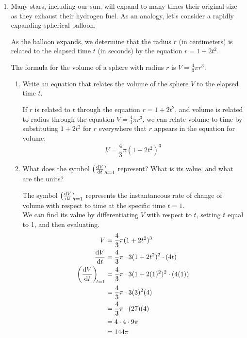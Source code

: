 \documentclass[main]{subfiles}
\begin{document}
\begin{enumerate}
\item Many stars, including our sun, will expand to many times their original size as they exhaust their hydrogen fuel. As an analogy, let's consider a rapidly expanding spherical balloon.

As the balloon expands, we determine that the radius $r$ (in centimeters) is related to the elapsed time $t$ (in seconds) by the equation $r=1+2t^2$.

The formula for the volume of a sphere with radius $r$ is $V=\tfrac{4}{3}\pi r^3$.

\begin{enumerate}
\item
\begin{problem}
Write an equation that relates the volume of the sphere $V$ to the elapsed time $t$.
\end{problem}

\begin{solution}
    If $r$ is related to $t$ through the equation $r=1+2t^2$, and volume is related to radius through the equation $V=\frac{4}{3}\pi r^3$, we can relate volume to time by substituting $1+2t^2$ for $r$ everywhere that $r$ appears in the equation for volume.
    $$V=\frac{4}{3} \pi (1+2t^2)^3$$
\end{solution}
\item
\begin{problem}
What does the symbol $\diff{V}{t}[t=1]$ represent? What is its value, and what are the units?
\end{problem}
\pspace{\vfill}

\begin{solution}
    The symbol $\diff{V}{t}[t=1]$ represents the instantaneous rate of change of volume with respect to time at the specific time $t=1$.\\
    We can find its value by differentiating $V$ with respect to $t$, setting $t$ equal to 1, and then evaluating.\\
    \begin{align*}
        V &=\frac{4}{3} \pi (1+2t^2)^3\\
        \diff{V}{t} &= \frac{4}{3}\pi \cdot 3(1+2t^2)^2\cdot (4t)\\
    \diff{V}{t}[t=1] &= \frac{4}{3}\pi \cdot 3(1+2 (1)^2)^2 \cdot(4(1))\\
    &=\frac{4}{3}\pi\cdot 3(3)^2(4)\\
    &=\frac{4}{3}\pi \cdot (27)(4)\\
    &=4\cdot 4 \cdot 9 \pi\\
    &=144\pi
    \end{align*}
\end{solution}


\end{enumerate}
\end{enumerate}
\end{document}
